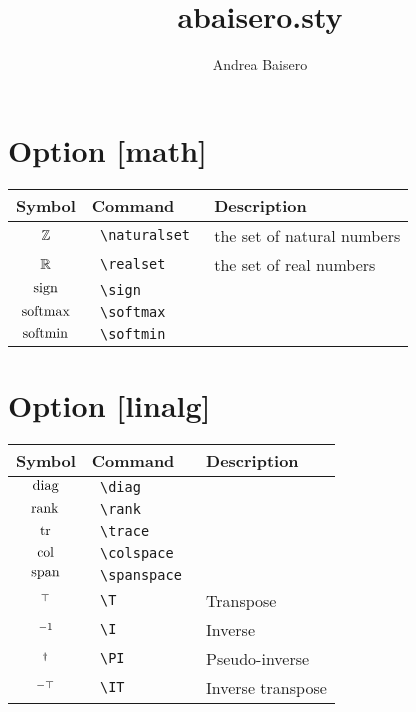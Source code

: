 \documentclass{article}
\begin{document}
\title{abaisero.sty}
\author{Andrea Baisero}

\maketitle

\section*{Option [math]}

\begin{tabular}{cll}
  Symbol & Command & Description \\
  \hline
  $\mathbb{Z}$ & \texttt{ \textbackslash naturalset } & the set of natural numbers \\
  $\mathbb{R}$ & \texttt{ \textbackslash realset } & the set of real numbers \\
  $\operatorname*{sign}$ & \texttt{ \textbackslash sign } & \\
  $\operatorname*{softmax}$ & \texttt{ \textbackslash softmax } & \\
  $\operatorname*{softmin}$ & \texttt{ \textbackslash softmin } & \\
\end{tabular}

\section*{Option [linalg]}

\begin{tabular}{cll}
  Symbol & Command & Description \\
  \hline
  $\operatorname*{diag}$ & \texttt{ \textbackslash diag } & \\
  $\operatorname*{rank}$ & \texttt{ \textbackslash rank } & \\
  $\operatorname*{tr}$ & \texttt{ \textbackslash trace } & \\
  $\operatorname*{col}$ & \texttt{ \textbackslash colspace } & \\
  $\operatorname*{span}$ & \texttt{ \textbackslash spanspace } & \\
  $^\top$ & \texttt{ \textbackslash T } & Transpose \\
  $^{-1}$ & \texttt{ \textbackslash I } & Inverse \\
  $^\dagger$ & \texttt{ \textbackslash PI } & Pseudo-inverse \\
  $^{-\top}$ & \texttt{ \textbackslash IT } & Inverse transpose \\
\end{tabular}
\end{document}
